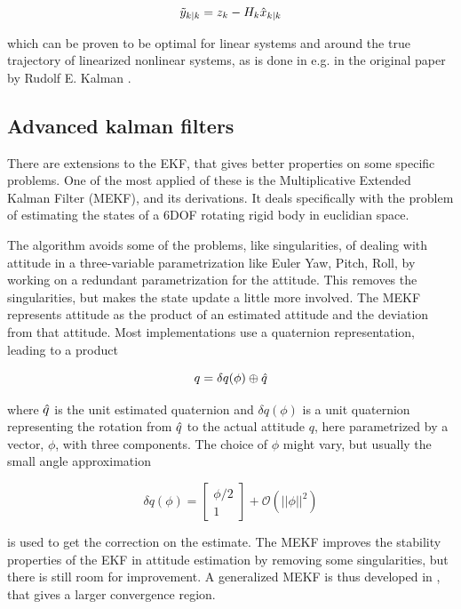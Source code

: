 \begin{equation}
    \Tilde{y}_{k|k} = z_k - H_k\hat{x}_{k|k}
\end{equation}

which can be proven to be optimal for linear systems and around the true trajectory of linearized nonlinear systems, as is done in e.g. in the original paper by Rudolf E. Kalman \cite{kalmanOG}.

\subsection{Advanced kalman filters}
There are extensions to the EKF, that gives better properties on some specific problems. One of the most applied of these is the Multiplicative Extended Kalman Filter (MEKF)\cite{MEKF}, and its derivations. It deals specifically with the problem of estimating the states of a 6DOF rotating rigid body in euclidian space. 

The algorithm avoids some of the problems, like singularities, of dealing with attitude in a three-variable parametrization like Euler Yaw, Pitch, Roll, by working on a redundant parametrization for the attitude. This removes the singularities, but makes the state update a little more involved. The MEKF represents attitude as the product of an estimated attitude and the deviation from that attitude. Most implementations use a quaternion representation, leading to a product 

\begin{equation}
    q = \delta q(\phi)\oplus \Hat{q}
\end{equation}

where $\Hat{q}$ is the unit estimated quaternion and $\delta q(\phi)$ is a unit quaternion representing the rotation from $\Hat{q}$ to the actual attitude $q$, here parametrized by a vector, $\phi$, with three components. The choice of $\phi$ might vary, but usually the small angle approximation

\begin{equation}
    \delta q(\phi) = \begin{bmatrix} \phi / 2 \\ 1 \end{bmatrix} + \mathcal{O}(||\phi||^2)
\end{equation}

is used to get the correction on the estimate. The MEKF improves the stability properties of the EKF in attitude estimation by removing some singularities, but there is still room for improvement. A generalized MEKF is thus developed in \cite{GMEKF}, that gives a larger convergence region. 


